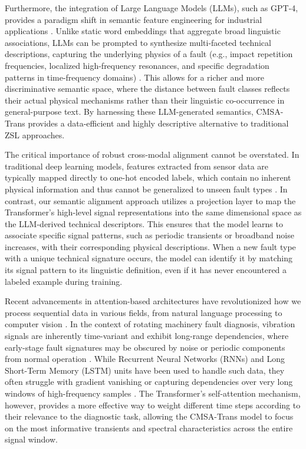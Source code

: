 Furthermore, the integration of Large Language Models (LLMs), such as GPT-4, provides a paradigm shift in semantic feature engineering for industrial applications \cite{bubeck2023sparks}. Unlike static word embeddings that aggregate broad linguistic associations, LLMs can be prompted to synthesize multi-faceted technical descriptions, capturing the underlying physics of a fault (e.g., impact repetition frequencies, localized high-frequency resonances, and specific degradation patterns in time-frequency domains) \cite{brown2020language}. This allows for a richer and more discriminative semantic space, where the distance between fault classes reflects their actual physical mechanisms rather than their linguistic co-occurrence in general-purpose text. By harnessing these LLM-generated semantics, CMSA-Trans provides a data-efficient and highly descriptive alternative to traditional ZSL approaches.

The critical importance of robust cross-modal alignment cannot be overstated. In traditional deep learning models, features extracted from sensor data are typically mapped directly to one-hot encoded labels, which contain no inherent physical information and thus cannot be generalized to unseen fault types \cite{goodfellow2016deep, lecun2015deep}. In contrast, our semantic alignment approach utilizes a projection layer to map the Transformer's high-level signal representations into the same dimensional space as the LLM-derived technical descriptors. This ensures that the model learns to associate specific signal patterns, such as periodic transients or broadband noise increases, with their corresponding physical descriptions. When a new fault type with a unique technical signature occurs, the model can identify it by matching its signal pattern to its linguistic definition, even if it has never encountered a labeled example during training.

Recent advancements in attention-based architectures have revolutionized how we process sequential data in various fields, from natural language processing to computer vision \cite{devlin2018bert, dosovitskiy2020image}. In the context of rotating machinery fault diagnosis, vibration signals are inherently time-variant and exhibit long-range dependencies, where early-stage fault signatures may be obscured by noise or periodic components from normal operation \cite{zhang2021attention}. While Recurrent Neural Networks (RNNs) and Long Short-Term Memory (LSTM) units have been used to handle such data, they often struggle with gradient vanishing or capturing dependencies over very long windows of high-frequency samples \cite{hochreiter1997long}. The Transformer’s self-attention mechanism, however, provides a more effective way to weight different time steps according to their relevance to the diagnostic task, allowing the CMSA-Trans model to focus on the most informative transients and spectral characteristics across the entire signal window.

